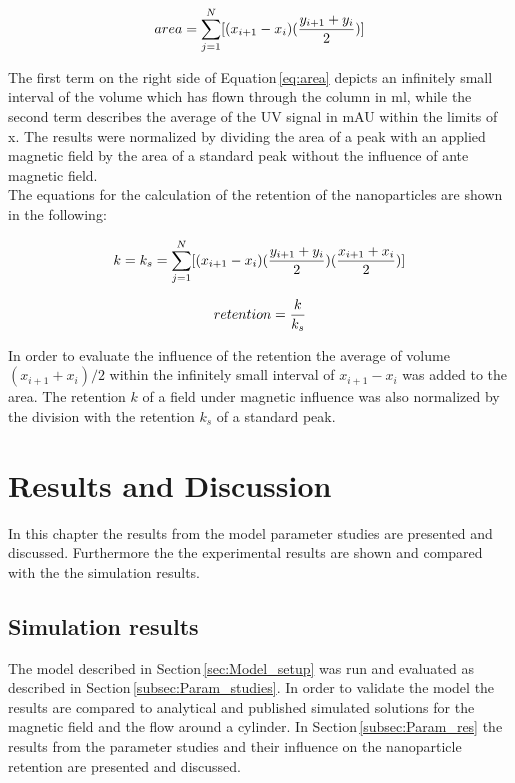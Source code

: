 \begin{equation}
\label{eq:area}
\centering
area = \sum_{j=1}^{N}[(x_{i+1}-x_{i})(\frac{y_{i+1}+y_{i}}{2})]
\end{equation}

The first term on the right side of Equation\,\ref{eq:area} depicts an infinitely small interval of the volume which has flown through the column in ml, while the second term describes the average of the UV signal in mAU within the limits of x. The results were normalized by dividing the area of a peak with an applied magnetic field by the area of a standard peak without the influence of ante magnetic field. \\


The equations for the calculation of the retention of the nanoparticles are shown in the following: 

\begin{equation}
\label{eq:ret_sum}
\centering
k = k_{s} = \sum_{j=1}^{N}[(x_{i+1}-x_{i})(\frac{y_{i+1}+y_{i}}{2})(\frac{x_{i+1}+x_{i}}{2})]
\end{equation}

\begin{equation}
\label{eq:ret_comp}
\centering
retention = \frac{k}{k_{s}}
\end{equation}

In order to evaluate the influence of the retention the average of volume $(x_{i+1}+x_{i})/2$ within the infinitely small interval of $x_{i+1}-x_{i}$ was added to the area. The retention $k$ of a field under magnetic influence was also normalized by the division with the retention $k_{s}$ of a standard peak.   



\chapter{Results and Discussion}
\label{chap:chap_res}
In this chapter the results from the model parameter studies are presented and discussed. Furthermore the the experimental results are shown and compared with the the simulation results. 

\section{Simulation results}
\label{sec:sim_res}
The model described in Section\,\ref{sec:Model_setup} was run and evaluated as described in Section\,\ref{subsec:Param_studies}. In order to validate the model the results are compared to analytical and published simulated solutions for the magnetic field and the flow around a cylinder. In Section\,\ref{subsec:Param_res} the results from the parameter studies and their influence on the nanoparticle retention are presented and discussed.  

